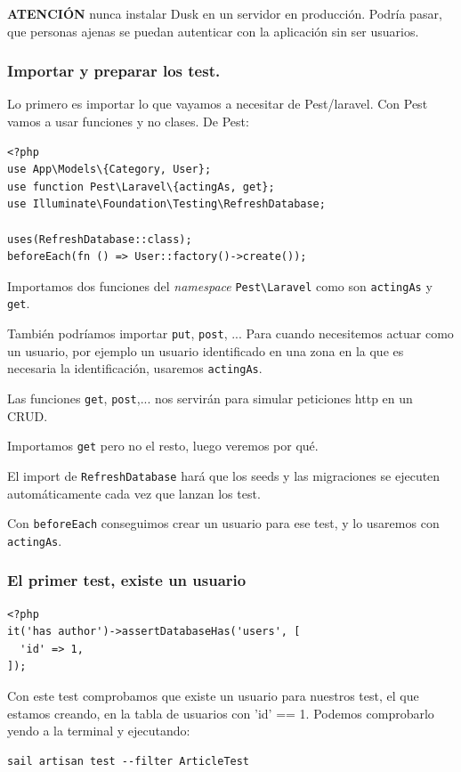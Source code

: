 \documentclass[11pt]{article}
\begin{document}
\textbf{ATENCIÓN} nunca instalar Dusk en un servidor en producción. Podría
pasar, que personas ajenas se puedan autenticar con la aplicación sin
ser usuarios.

\subsubsection{Importar y preparar los test.}
\label{sec:orgea87e12}
Lo primero es importar lo que vayamos a necesitar de Pest/laravel.
Con Pest vamos a usar funciones y no clases. De Pest:
\begin{verbatim}
<?php
use App\Models\{Category, User};
use function Pest\Laravel\{actingAs, get};
use Illuminate\Foundation\Testing\RefreshDatabase;

uses(RefreshDatabase::class);
beforeEach(fn () => User::factory()->create());
\end{verbatim}
Importamos dos funciones del \emph{namespace} \texttt{Pest\textbackslash{}Laravel} como son
\texttt{actingAs} y \texttt{get}.

También podríamos importar \texttt{put}, \texttt{post}, ... Para cuando necesitemos
actuar como un usuario, por ejemplo un usuario identificado en una
zona en la que es necesaria la identificación, usaremos \texttt{actingAs}.

Las funciones \texttt{get}, \texttt{post},... nos servirán para simular peticiones
http en un CRUD.

Importamos \texttt{get} pero no el resto, luego veremos por qué.

El import de \texttt{RefreshDatabase} hará que los seeds y las migraciones se
ejecuten automáticamente cada vez que lanzan los test.

Con \texttt{beforeEach} conseguimos crear un usuario para ese test, y lo
usaremos con \texttt{actingAs}.

\subsubsection{El primer test, existe un usuario}
\label{sec:orgdb65ba8}
\begin{verbatim}
<?php
it('has author')->assertDatabaseHas('users', [
  'id' => 1,
]);
\end{verbatim}
Con este test comprobamos que existe un usuario para nuestros test, el
que estamos creando, en la tabla de usuarios con 'id' == 1.
Podemos comprobarlo yendo a la terminal y ejecutando:
\begin{verbatim}
sail artisan test --filter ArticleTest
\end{verbatim}
\end{document}
